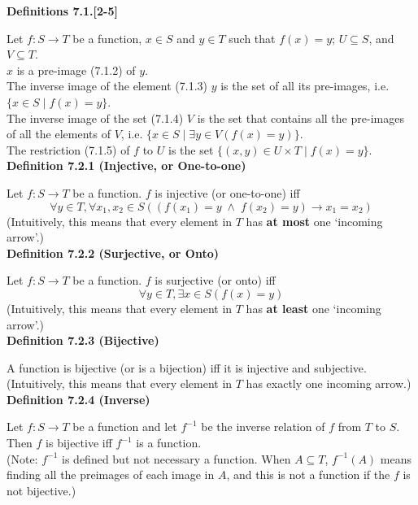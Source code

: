 \documentclass[a4paper]{article}
\newcommand{\subheading}[1]{{\scriptsize\textbf{#1}}}
\begin{document}
\begin{multicols*}{4}
\subheading{Definitions 7.1.[2-5]}

Let $f : S \rightarrow T$ be a function, $x \in S$ and $y \in T$ such that
$f(x)=y$; $U \subseteq S$, and $V \subseteq T$.\\

$x$ is a pre-image (7.1.2) of $y$.\\

The inverse image of the element (7.1.3) $y$ is the set of all its pre-images,
i.e. $\{x \in S\;|\;f(x) = y\}$.\\

The inverse image of the set (7.1.4) $V$ is the set that contains all the
pre-images of all the elements of $V$, i.e.
$\{x \in S\;|\;\exists y \in V (f(x) = y)\}$.\\

The restriction (7.1.5) of $f$ to $U$ is the set
$\{(x, y) \in U \times T\;|\;f(x)=y\}$.\\

\subheading{Definition 7.2.1 (Injective, or One-to-one)}

Let $f : S \rightarrow T$ be a function. $f$ is injective (or one-to-one) iff
$$\forall y \in T, \forall x_1, x_2 \in S (
(f(x_1) = y\;\land\;f(x_2) = y) \rightarrow x_1 = x_2)$$
(Intuitively, this means that every element in $T$ has \textbf{at most} one `incoming
arrow'.)\\

\subheading{Definition 7.2.2 (Surjective, or Onto)}

Let $f : S \rightarrow T$ be a function. $f$ is surjective (or onto) iff
$$\forall y \in T, \exists x \in S (f(x) = y)$$
(Intuitively, this means that every element in $T$ has \textbf{at least} one `incoming
arrow'.)\\

\subheading{Definition 7.2.3 (Bijective)}

A function is bijective (or is a bijection) iff it is injective and
subjective.\\
(Intuitively, this means that every element in $T$ has exactly one
incoming arrow.)\\

\subheading{Definition 7.2.4 (Inverse)}

Let $f : S \rightarrow T$ be a function and let $f^{-1}$ be the inverse relation
of $f$ from $T$ to $S$. Then $f$ is bijective iff $f^{-1}$ is a function.\\
(Note: $f^{-1}$ is defined but not necessary a function. When $A \subseteq T$, $f^{-1}(A)$ means finding all the preimages of each image in $A$, and this is not a function if the $f$ is not bijective.)\\


\end{multicols*}
\end{document}
